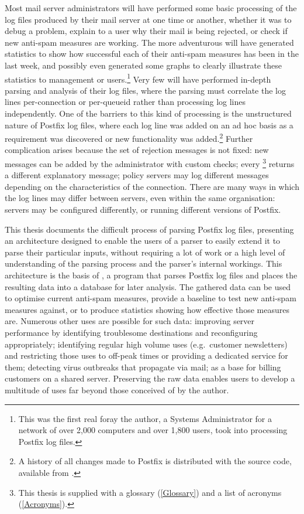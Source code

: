 Most mail server administrators will have performed some basic processing
of the log files produced by their mail server at one time or another,
whether it was to debug a problem, explain to a user why their mail is
being rejected, or check if new anti-spam measures are working.  The more
adventurous will have generated statistics to show how successful each of
their anti-spam measures has been in the last week, and possibly even
generated some graphs to clearly illustrate these statistics to management
or users.\footnote{This was the first real foray the author, a Systems
Administrator for a network of over 2,000 computers and over 1,800 users,
took into processing Postfix log files.}  Very few will have performed
in-depth parsing and analysis of their log files, where the parsing must
correlate the log lines per-connection or per-queueid rather than
processing log lines independently.  One of the barriers to this kind of
processing is the unstructured nature of Postfix log files, where each log
line was added on an ad hoc basis as a requirement was discovered or new
functionality was added.\footnote{A history of all changes made to Postfix
is distributed with the source code, available from
.}  Further
complication arises because the set of rejection messages is not fixed: new
messages can be added by the administrator with custom checks; every
\footnote{This thesis is supplied with a glossary
(\textsection\ref{Glossary}) and a list of acronyms
(\textsection\ref{Acronyms}).} returns a different explanatory message;
policy servers may log different messages depending on the characteristics
of the connection.  There are many ways in which the log lines may differ
between servers, even within the same organisation: servers may be
configured differently, or running different versions of Postfix.

This thesis documents the difficult process of parsing Postfix log files,
presenting an architecture designed to enable the users of a parser to
easily extend it to parse their particular inputs, without requiring a lot
of work or a high level of understanding of the parsing process and the
parser's internal workings.  This architecture is the basis of
\parsername{}, a program that parses Postfix log files and places the
resulting data into a database for later analysis.  The gathered data can
be used to optimise current anti-spam measures, provide a baseline to test
new anti-spam measures against, or to produce statistics showing how
effective those measures are.  Numerous other uses are possible for such
data: improving server performance by identifying troublesome destinations
and reconfiguring appropriately; identifying regular high volume uses
(e.g.\ customer newsletters) and restricting those uses to off-peak times
or providing a dedicated service for them; detecting virus outbreaks that
propagate via mail; as a base for billing customers on a shared server.
Preserving the raw data enables users to develop a multitude of uses far
beyond those conceived of by the author.

